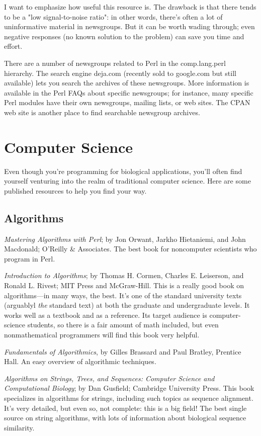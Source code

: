I want to emphasize how useful this resource is. The drawback is that there tends to be a "low signal-to-noise ratio": in other words, there's often a lot of uninformative material in newsgroups. But it can be worth wading through; even negative responses (no known solution to the problem) can save you time and effort.

There are a number of newsgroups related to Perl in the comp.lang.perl hierarchy. The search engine deja.com (recently sold to google.com but still available) lets you search the archives of these newsgroups. More information is available in the Perl FAQs about specific newsgroups; for instance, many specific Perl modules have their own newsgroups, mailing lists, or web sites. The CPAN web site is another place to find searchable newsgroup archives.

\section{Computer Science}
Even though you're programming for biological applications, you'll often find yourself venturing into the realm of traditional computer science. Here are some published resources to help you find your way.

\subsection{Algorithms}
\textit{Mastering Algorithms with Perl}; by Jon Orwant, Jarkho Hietaniemi, and John Macdonald; O'Reilly \& Associates. The best book for noncomputer scientists who program in Perl.

\textit{Introduction to Algorithms}; by Thomas H. Cormen, Charles E.  Leiserson, and Ronald L. Rivest; MIT Press and McGraw-Hill. This is a really good book on algorithms—in many ways, the best. It's one of the standard university texts (arguablyl \textit{the} standard text) at both the graduate and undergraduate levels. It works well as a textbook and as a reference. Its target audience is computer-science students, so there is a fair amount of math included, but even nonmathematical programmers will find this book very helpful.

\textit{Fundamentals of Algorithmics}, by Gilles Brassard and Paul Bratley, Prentice Hall. An easy overview of algorithmic techniques.

\textit{Algorithms on Strings, Trees, and Sequences: Computer Science and Computational Biology}; by Dan Gusfield; Cambridge University Press. This book specializes in algorithms for strings, including such topics as sequence alignment. It's very detailed, but even so, not complete: this is a big field! The best single source on string algorithms, with lots of information about biological sequence similarity.

